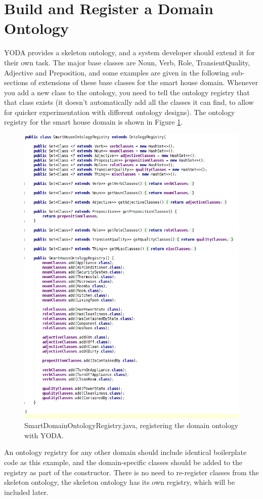 \documentclass[titlepage]{article}
\begin{document}
\section{Build and Register a Domain Ontology}

YODA provides a skeleton ontology, and a system developer should extend it for their own task.
The major base classes are Noun, Verb, Role, TransientQuality, Adjective and Preposition, and some examples are given in the following sub-sections of extensions of these base classes for the smart house domain.
Whenever you add a new class to the ontology, you need to tell the ontology registry that that class exists (it doesn't automatically add all the classes it can find, to allow for quicker experimentation with different ontology designs).
The ontology registry for the smart house domain is shown in Figure \ref{fig:smart_house_ontology_registry}.

\begin{figure}[h!]
\centering
\includegraphics[width=.75\textwidth]{OntologyRegistry}
\caption{SmartDomainOntologyRegistry.java, registering the domain ontology with YODA.}
\label{fig:smart_house_ontology_registry}
\end{figure}

An ontology registry for any other domain should include identical boilerplate code as this example, and the domain-specific classes should be added to the registry as part of the constructor.
There is no need to re-register classes from the skeleton ontology, the skeleton ontology has its own registry, which will be included later.
\end{document}
